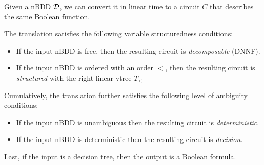 \begin{proposition}
  Given a nBDD $\mathcal{D}$, we can convert it in linear time to a circuit $C$
  that describes the same Boolean function.

  The translation satisfies the following variable structuredness
  conditions:
  \begin{itemize}
    \item If the input nBDD is free,
    then the resulting circuit is
    \emph{decomposable} (DNNF).
  \item If the input nBDD is ordered with an order $<$, then the
    resulting circuit is \emph{structured} with the right-linear vtree $T_<$
  \end{itemize}

  Cumulatively, the translation further satisfies the following level of ambiguity conditions:
  \begin{itemize}
    \item If the input nBDD is unambiguous then the resulting circuit
      is \emph{deterministic}.
    \item If the input nBDD is deterministic then the resulting circuit
      is \emph{decision}.
  \end{itemize}
  
  Last, if the input is a decision tree, then the output is a Boolean formula.
\end{proposition}


